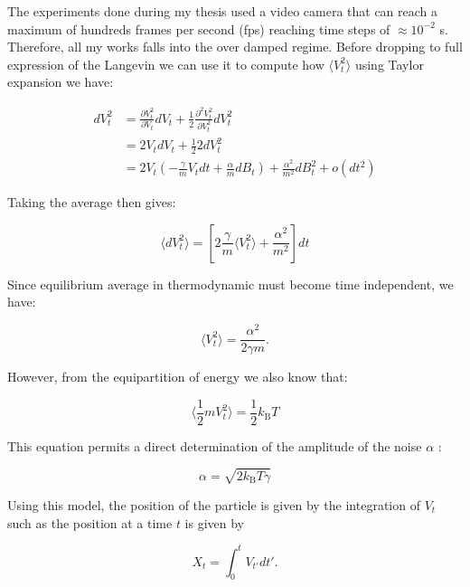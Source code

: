 The experiments done during my thesis used a video camera that can reach a maximum of hundreds frames per second (\gls{fps}) reaching time steps of $\approx 10^{-2}$ s. Therefore, all my works falls into the over damped regime. Before dropping to full expression of the Langevin we can use it to compute how $\langle V_t ^2 \rangle$ using Taylor expansion we have:

\begin{equation}
	\begin{aligned}
	dV_t^2 &= \frac{\partial V_t ^ 2}{\partial V_t} d V_t + \frac{1}{2} \frac{\partial ^2 V_t^2}{\partial V_t ^2} dV_t^2  \\
	& = 2 V_t dV_t + \frac{1}{2} 2dV_t^2 \\
	& = 2V_t\left( -\frac{\gamma}{m}V_tdt + \frac{\alpha}{m}dB_t  \right) + \frac{\alpha^2}{m^2}dB_t ^2 + o(dt^2)
	\end{aligned}
\end{equation}

Taking the average then gives:

\begin{equation}
	\langle dV_t^2 \rangle = \left[2 \frac{\gamma}{m} \langle V_t ^2 \rangle + \frac{\alpha^2}{m^2}\right]dt
\end{equation}

Since equilibrium average in thermodynamic must become time independent, we have:

\begin{equation}
	\langle V_t ^2\rangle = \frac{\alpha ^2}{2 \gamma m}.
\end{equation}

However, from the equipartition of energy we also know that:

\begin{equation}
	\langle \frac{1}{2} m V_t ^2 \rangle  = \frac{1}{2} k_\mathrm{B} T
\end{equation}

This equation permits a direct determination of the amplitude of the noise $\alpha$ : 

\begin{equation}
	\alpha = \sqrt{2k_\mathrm{B}T \gamma}
\end{equation}

Using this model, the position of the particle is given by the integration of $V_t$ such as the position at a time $t$ is given by

\begin{equation}
	X_t = \int _0 ^t V_{t'}dt'.
	\label{Eq:particle_position}
\end{equation}

